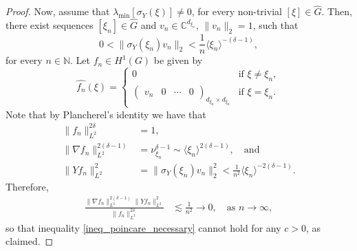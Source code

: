 \documentclass[11pt]{amsart}
\numberwithin{theorem}{section}
\numberwithin{equation}{section}
\theoremstyle{definition}
\numberwithin{example}{section}
\theoremstyle{definition}
\theoremstyle{definition}
\newcommand{\N}{\mathbb{N}}
\newcommand{\C}{\mathbb{C}}
\begin{document}
\begin{proof}
Now, assume that $\lambda_{\min}[\sigma_Y(\xi)]\neq 0$, for every non-trivial $[\xi]\in\widehat{G}$. Then,  there exist sequences $[\xi_n]\in\widehat{G}$ and $v_{n}\in \C^{d_{\xi_n}}$, $\|v_n\|_2=1$, such that 
\begin{equation*}
  0< \| \sigma_Y(\xi_n)v_n\|_2<\frac{1}{n}\langle \xi_n \rangle ^{-(\delta-1)},
\end{equation*}
for every $n\in\N$.
 Let $f_n\in H^1(G)$ be given by
\begin{equation*}
    \widehat{f_n}(\xi)=\begin{cases}
        0&\text{if }\xi\neq \xi_n,\\
         \begin{pmatrix}
        v_n&0&\cdots&0
    \end{pmatrix}_{d_{\xi_n}\times d_{\xi_n}}&\text{if }\xi=\xi_n.
    \end{cases}
\end{equation*}
    Note that by Plancherel's identity we have that 
    \begin{align*}
        \|f_n\|_{L^2}^{2\delta}&=1,\\
        \|\nabla f_n\|_{L^2}^{2(\delta-1)}&=\nu_{\xi_n}^{\delta-1}\sim\langle \xi_n\rangle^{2(\delta-1)},\quad \text{and}\\
        \|Yf_n\|_{L^2}^{2}&= \|\sigma_Y(\xi_n)v_n\|_2^2< \frac{1}{n^2}\langle\xi_n\rangle^{-2(\delta-1)}.
    \end{align*} 
    Therefore,
    \begin{align*}
         \frac{ \|\nabla f_n\|_{L^2}^{2(\delta-1)}\| Yf_n\|_{L^2}^2}{\|f_n\|_{L^2}^{2\delta}}&\lesssim \frac{1}{n^2}\to 0,\quad \text{as } n\to \infty,
    \end{align*}
 so that inequality \eqref{ineq_poincare_necessary} cannot hold for any $c>0$, as claimed. 
\end{proof}
\end{document}
